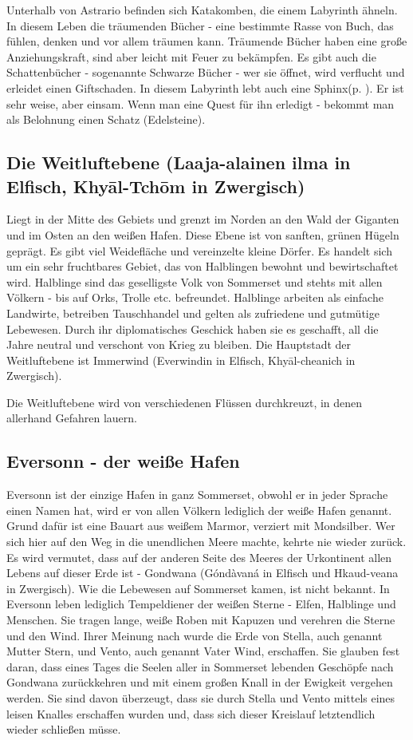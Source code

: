 \documentclass[11pt, twoside]{article}
\begin{document}
Unterhalb von Astrario befinden sich Katakomben, die einem Labyrinth ähneln. In diesem Leben die träumenden Bücher - eine bestimmte Rasse von Buch, das fühlen, denken und vor allem träumen kann. Träumende Bücher haben eine große Anziehungskraft, sind aber leicht mit Feuer zu bekämpfen. Es gibt auch die Schattenbücher - sogenannte Schwarze Bücher - wer sie öffnet, wird verflucht und erleidet einen Giftschaden. In diesem Labyrinth lebt auch eine Sphinx(p. \pageref{sphinx}). Er ist sehr weise, aber einsam. Wenn man eine Quest für ihn erledigt - bekommt man als Belohnung einen Schatz (Edelsteine).

\subsection{Die Weitluftebene (Laaja-alainen ilma in Elfisch, Khyāl-Tchōm in Zwergisch)}
\label{sec:org62055af}
Liegt in der Mitte des Gebiets und grenzt im Norden an den Wald der Giganten und im Osten an den weißen Hafen. Diese Ebene ist von sanften, grünen Hügeln geprägt. Es gibt viel Weidefläche und vereinzelte kleine Dörfer. Es handelt sich um ein sehr fruchtbares Gebiet, das von Halblingen bewohnt und bewirtschaftet wird. Halblinge sind das geselligste Volk von Sommerset und stehts mit allen Völkern - bis auf Orks, Trolle etc. befreundet. Halblinge arbeiten als einfache Landwirte, betreiben Tauschhandel und gelten als zufriedene und gutmütige Lebewesen. Durch ihr diplomatisches Geschick haben sie es geschafft, all die Jahre neutral und verschont von Krieg zu bleiben. Die Hauptstadt der Weitluftebene ist Immerwind (Everwindin in Elfisch, Khyāl-cheanich in Zwergisch).

Die Weitluftebene wird von verschiedenen Flüssen durchkreuzt, in denen allerhand Gefahren lauern.

\subsection{Eversonn - der weiße Hafen}
\label{sec:orgcc5a81f}
Eversonn ist der einzige Hafen in ganz Sommerset, obwohl er in jeder Sprache einen Namen hat, wird er von allen Völkern lediglich der weiße Hafen genannt. Grund dafür ist eine Bauart aus weißem Marmor, verziert mit Mondsilber. Wer sich hier auf den Weg in die unendlichen Meere machte, kehrte nie wieder zurück. Es wird vermutet, dass auf der anderen Seite des Meeres der Urkontinent allen Lebens auf dieser Erde ist - Gondwana (Góndàvaná in Elfisch und Hkaud-veana in Zwergisch). Wie die Lebewesen auf Sommerset kamen, ist nicht bekannt. In Eversonn leben lediglich Tempeldiener der weißen Sterne - Elfen, Halblinge und Menschen. Sie tragen lange, weiße Roben mit Kapuzen und verehren die Sterne und den Wind. Ihrer Meinung nach wurde die Erde von Stella, auch genannt Mutter Stern, und Vento, auch genannt Vater Wind, erschaffen. Sie glauben fest daran, dass eines Tages die Seelen aller in Sommerset lebenden Geschöpfe nach Gondwana zurückkehren und mit einem großen Knall in der Ewigkeit vergehen werden. Sie sind davon überzeugt, dass sie durch Stella und Vento mittels eines leisen Knalles erschaffen wurden und, dass sich dieser Kreislauf letztendlich wieder schließen müsse.
\end{document}
